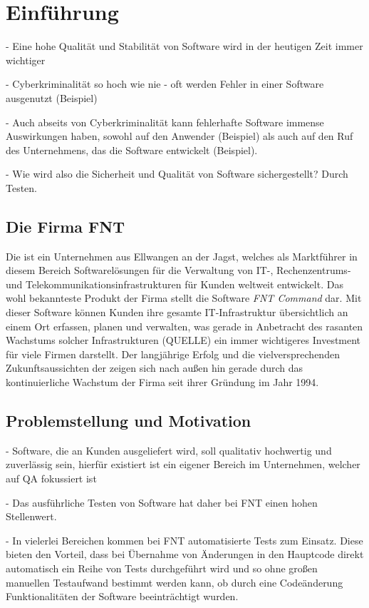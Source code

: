 \chapter{Einführung}\label{ch:einfuehrung}
- Eine hohe Qualität und Stabilität von Software wird in der heutigen Zeit immer wichtiger

- Cyberkriminalität so hoch wie nie - oft werden Fehler in einer Software ausgenutzt (Beispiel)

- Auch abseits von Cyberkriminalität kann fehlerhafte Software immense Auswirkungen haben, sowohl auf den Anwender (Beispiel) als auch auf den Ruf des Unternehmens, das die Software entwickelt (Beispiel).

- Wie wird also die Sicherheit und Qualität von Software sichergestellt? Durch Testen.


\section{Die Firma FNT}\label{sec:fnt}
Die \textit{\companyName{}} ist ein Unternehmen aus Ellwangen an der Jagst, welches als Marktführer in diesem Bereich Softwarelösungen für die Verwaltung von IT-, Rechenzentrums- und Telekommunikationsinfrastrukturen für Kunden weltweit entwickelt. \cite{fnt:2021} Das wohl bekannteste Produkt der Firma stellt die Software \textit{FNT Command} dar. Mit dieser Software können Kunden ihre gesamte IT-Infrastruktur übersichtlich an einem Ort erfassen, planen und verwalten, was gerade in Anbetracht des rasanten Wachstums solcher Infrastrukturen (QUELLE) ein immer wichtigeres Investment für viele Firmen darstellt. Der langjährige Erfolg und die vielversprechenden Zukunftsaussichten der \textit{\companyName{}} zeigen sich nach außen hin gerade durch das kontinuierliche Wachstum der Firma seit ihrer Gründung im Jahr 1994.

\section{Problemstellung und Motivation}\label{sec:motivation}
- Software, die an Kunden ausgeliefert wird, soll qualitativ hochwertig und zuverlässig sein, hierfür existiert ist ein eigener Bereich im Unternehmen, welcher auf QA fokussiert ist 

- Das ausführliche Testen von Software hat daher bei FNT einen hohen Stellenwert.

- In vielerlei Bereichen kommen bei FNT automatisierte Tests zum Einsatz. Diese bieten den Vorteil, dass bei Übernahme von Änderungen in den Hauptcode direkt automatisch ein Reihe von Tests durchgeführt wird und so ohne großen manuellen Testaufwand bestimmt werden kann, ob durch eine Codeänderung Funktionalitäten der Software beeinträchtigt wurden.


